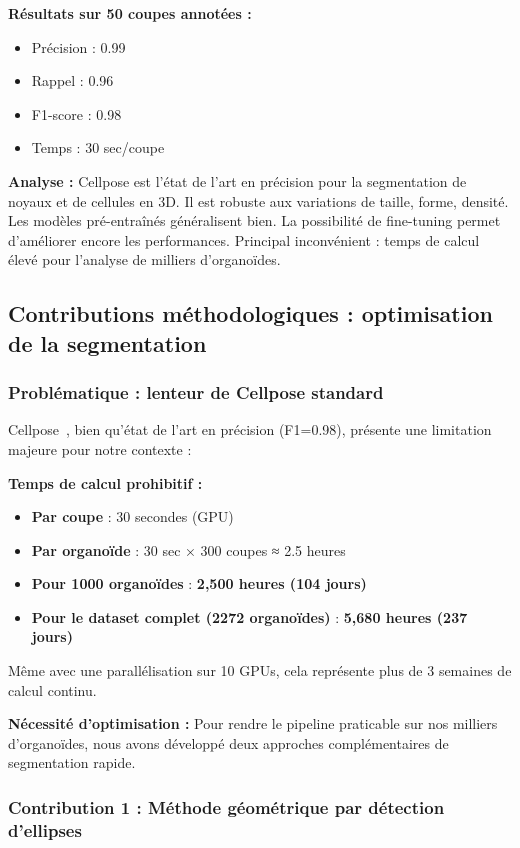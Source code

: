 \textbf{Résultats sur 50 coupes annotées :}
\begin{itemize}
    \item Précision : 0.99
    \item Rappel : 0.96
    \item F1-score : 0.98
    \item Temps : 30 sec/coupe
\end{itemize}

\textbf{Analyse :}
Cellpose est l'état de l'art en précision pour la segmentation de noyaux et de cellules en 3D. Il est robuste aux variations de taille, forme, densité. Les modèles pré-entraînés généralisent bien. La possibilité de fine-tuning permet d'améliorer encore les performances. Principal inconvénient : temps de calcul élevé pour l'analyse de milliers d'organoïdes.

\subsection{Contributions méthodologiques : optimisation de la segmentation}

\subsubsection{Problématique : lenteur de Cellpose standard}

Cellpose~\cite{Stringer2021}, bien qu'état de l'art en précision (F1=0.98), présente une limitation majeure pour notre contexte :

\textbf{Temps de calcul prohibitif :}
\begin{itemize}
    \item \textbf{Par coupe} : 30 secondes (GPU)
    \item \textbf{Par organoïde} : 30 sec × 300 coupes ≈ 2.5 heures
    \item \textbf{Pour 1000 organoïdes} : \textbf{2,500 heures (104 jours)}
    \item \textbf{Pour le dataset complet (2272 organoïdes)} : \textbf{5,680 heures (237 jours)}
\end{itemize}

Même avec une parallélisation sur 10 GPUs, cela représente plus de 3 semaines de calcul continu.

\textbf{Nécessité d'optimisation :}
Pour rendre le pipeline praticable sur nos milliers d'organoïdes, nous avons développé deux approches complémentaires de segmentation rapide.

\subsubsection{Contribution 1 : Méthode géométrique par détection d'ellipses}

